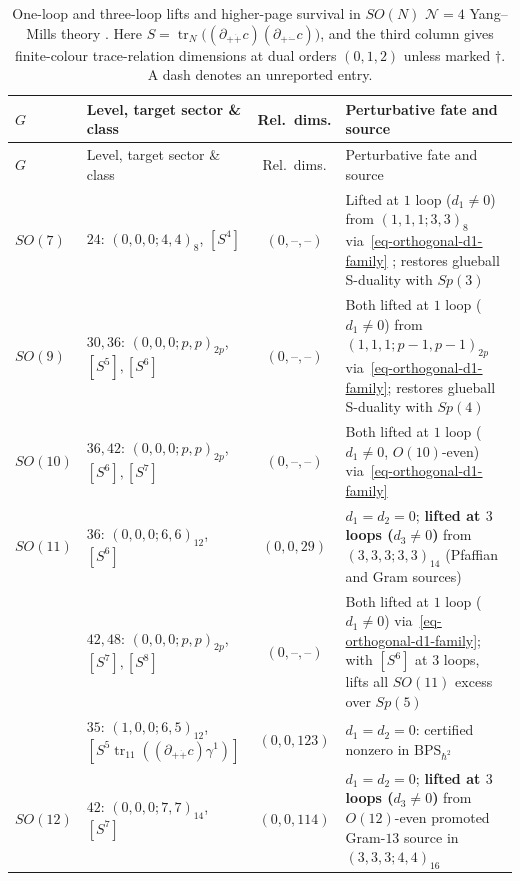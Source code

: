 \documentclass[11pt]{article}
\numberwithin{equation}{section}
\numberwithin{figure}{section}
\numberwithin{table}{section}
\begin{document}
\begin{enumerate}
\end{enumerate}

{\footnotesize\renewcommand{\arraystretch}{1.25}\setlength{\tabcolsep}{3.5pt}
\begin{xltabular}{\linewidth}{|l|>{\raggedright\arraybackslash}p{4.05cm}|c|>{\raggedright\arraybackslash}X|}
\caption{One-loop and three-loop lifts and higher-page survival in $SO(N)$ $\mathcal N=4$ Yang--Mills theory \cite{Repo}. Here $S=\operatorname{tr}_N\bigl((\partial_{+\dot+}c)(\partial_{+\dot-}c)\bigr)$, and the third column gives finite-colour trace-relation dimensions at dual orders $(0,1,2)$ unless marked $\dagger$. A dash denotes an unreported entry.}\label{tab-orthogonal-d3-lifts}\\
\hline
$G$ & Level, target sector \& class & Rel.\ dims. & Perturbative fate and source\\
\hline\endfirsthead
\hline
$G$ & Level, target sector \& class & Rel.\ dims. & Perturbative fate and source\\
\hline\endhead
$SO(7)$ & $24$: $(0,0,0;4,4)_8$, $[S^4]$ & $(0,\text{--},\text{--})$ & Lifted at $1$ loop ($d_1\ne0$) from $(1,1,1;3,3)_8$ via~\eqref{eq-orthogonal-d1-family} \cite{KvLM}; restores glueball S-duality with $Sp(3)$\\
\hline
$SO(9)$ & $30,36$: $(0,0,0;p,p)_{2p}$, $[S^5],[S^6]$ & $(0,\text{--},\text{--})$ & Both lifted at $1$ loop ($d_1\ne0$) from $(1,1,1;p-1,p-1)_{2p}$ via~\eqref{eq-orthogonal-d1-family}; restores glueball S-duality with $Sp(4)$\\
\hline
$SO(10)$ & $36,42$: $(0,0,0;p,p)_{2p}$, $[S^6],[S^7]$ & $(0,\text{--},\text{--})$ & Both lifted at $1$ loop ($d_1\ne0$, $O(10)$-even) via~\eqref{eq-orthogonal-d1-family}\\
\hline
$SO(11)$ & $36$: $(0,0,0;6,6)_{12}$, $[S^6]$ & $(0,0,29)$ & $d_1=d_2=0$; \textbf{lifted at $3$ loops ($d_3\ne0$)} from $(3,3,3;3,3)_{14}$ (Pfaffian and Gram sources)\\
 & $42,48$: $(0,0,0;p,p)_{2p}$, $[S^7],[S^8]$ & $(0,\text{--},\text{--})$ & Both lifted at $1$ loop ($d_1\ne0$) via~\eqref{eq-orthogonal-d1-family}; with $[S^6]$ at $3$ loops, lifts all $SO(11)$ excess over $Sp(5)$\\
 & $35$: $(1,0,0;6,5)_{12}$, $[S^5\operatorname{tr}_{11}((\partial_{+\dot+}c)\gamma^1)]$ & $(0,0,123)$ & $d_1=d_2=0$: certified nonzero in $\mathrm{BPS}_{\hbar^2}$\\
\hline
$SO(12)$ & $42$: $(0,0,0;7,7)_{14}$, $[S^7]$ & $(0,0,114)$ & $d_1=d_2=0$; \textbf{lifted at $3$ loops ($d_3\ne0$)} from $O(12)$-even promoted Gram-$13$ source in $(3,3,3;4,4)_{16}$\\

\end{xltabular}}
\end{document}
